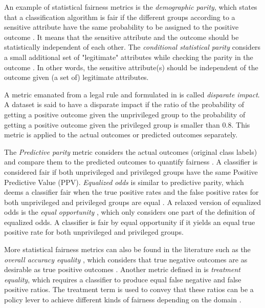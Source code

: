 An example of statistical fairness metrics is the \emph{demographic parity}, which states that a classification algorithm is fair if the different groups according to a sensitive attribute have the same probability to be assigned to the positive outcome \cite{dwork2012fairness,kamishima2011fairness}. It means that the sensitive attribute and the outcome should be statistically independent of each other. The \emph{conditional statistical parity} considers a small additional set of "legitimate" attributes while checking the parity in the outcome \cite{corbett2017algorithmic}. In other words, the sensitive attribute(s) should be independent of the outcome given (a set of) legitimate attributes. 

A metric emanated from a legal rule \cite{US_guideline} and formulated in \cite{feldman2015certifying} is called \emph{disparate impact}. A dataset is said to have a disparate impact if the ratio of the probability of getting a positive outcome given the unprivileged group to the probability of getting a positive outcome given the privileged group is smaller than $0.8$. This metric is applied to the actual outcomes or predicted outcomes separately. 

The \emph{Predictive parity} metric considers the actual outcomes (original class labels) and compare them to the predicted outcomes to quantify fairness \cite{verma2018fairness_explained}. A classifier is considered fair if both unprivileged and privileged groups have the same Positive Predictive Value (PPV). \emph{Equalized odds} is similar to predictive parity, which deems a classifier fair when the true positive rates and the false positive rates for both unprivileged and privileged groups are equal \cite{zafar2017fairness}. A relaxed version of equalized odds is the \emph{equal opportunity} \cite{hardt2016equal_odds_opport}, which only considers one part of the definition of equalized odds. A classifier is fair by equal opportunity if it yields an equal true positive rate for both unprivileged and privileged groups. 


More statistical fairness metrics can also be found in the literature such as the \emph{overall accuracy equality} \cite{berk2018fairness}, which considers that true negative outcomes are as desirable as true positive outcomes \cite{berk2018fairness}. Another metric defined in \cite{berk2018fairness} is \emph{treatment equality}, which requires a classifier to produce equal false negative and false positive ratios. The treatment term is used to convey that these ratios can be a policy lever to achieve different kinds of fairness depending on the domain \cite{berk2018fairness}.



